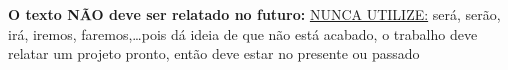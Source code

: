 \begin{CaixaVermelha}
   {\bf O texto NÃO deve ser relatado no futuro:} \underline{NUNCA UTILIZE:} será, serão, irá, iremos, faremos,\ldots pois dá ideia de que não está acabado, o trabalho deve relatar um projeto pronto, então deve estar no presente ou passado
\end{CaixaVermelha}

